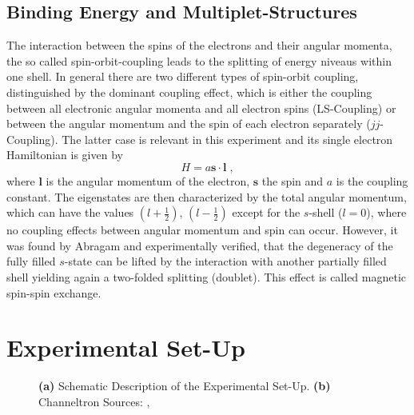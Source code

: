 \documentclass[a4paper]{scrartcl}
\numberwithin{equation}{section}
\numberwithin{figure}{section}
\numberwithin{table}{section}
\newcommand{\eq}[2]{\begin{equation}#1\label{#2}\end{equation}}
\newcommand{\ve}[1]{\mathbf{ #1} }
\begin{document}
\subsection{Binding Energy and Multiplet-Structures}
The interaction between the spins of the electrons and their angular momenta, the so called spin-orbit-coupling leads to the splitting of energy niveaus within one shell. In general there are two different types of spin-orbit coupling, distinguished by the dominant coupling effect, which is either the coupling between all electronic angular momenta and all electron spins (LS-Coupling) or between the angular momentum and the spin of each electron separately ($jj$-Coupling). The latter case is relevant in this experiment and its single electron Hamiltonian is given by
\eq{H=a \ve s \cdot \ve l\;,}{hamilton}
where $\ve l$ is the angular momentum of the electron, $\ve s$ the spin and $a$ is the coupling constant. The eigenstates are then characterized by the total angular momentum, which can have the values $(l+\tfrac 1 2)$, $(l - \tfrac 1 2)$ except for the $s$-shell ($l=0$), where no coupling effects between angular momentum and spin can occur. However, it was found by Abragam and experimentally verified, that the degeneracy of the fully filled $s$-state can be lifted by the interaction with another partially filled shell yielding again a two-folded splitting (doublet). This effect is called magnetic spin-spin exchange.

\clearpage
\section{Experimental Set-Up}

\begin{figure} 
 \centering
 \hfill

\caption{ \small \textbf{(a)} Schematic Description of the Experimental Set-Up. \textbf{(b)} Channeltron Sources: \cite{script}, \cite{gop} } 
	\label{fig:setup}
\end{figure}
\end{document}
